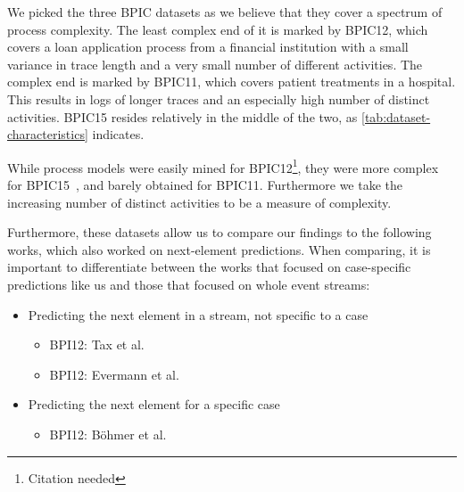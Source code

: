 We picked the three BPIC datasets as we believe that they cover a spectrum of process complexity. The least complex end of it is marked by BPIC12, which covers a loan application process from a financial institution with a small variance in trace length and a very small number of different activities. The complex end is marked by BPIC11, which covers patient treatments in a hospital. This results in logs of longer traces and an especially high number of distinct activities. BPIC15 resides relatively in the middle of the two, as \autoref{tab:dataset-characteristics} indicates.

While process models were easily mined for BPIC12\footnote{Citation needed}, they were more complex for BPIC15~\cite{van2015benchmarking}, and barely obtained for BPIC11. Furthermore we take the increasing number of distinct activities to be a measure of complexity.

Furthermore, these datasets allow us to compare our findings to the following works, which also worked on next-element predictions. When comparing, it is important to differentiate between the works that focused on case-specific predictions like us and those that focused on whole event streams:

\begin{itemize}
    \item Predicting the next element in a stream, not specific to a case
    \begin{itemize}
        \item BPI12: Tax et al.~\cite{tax2018interdisciplinary, tax2017}
        \item BPI12: Evermann et al.~\cite{evermann2016}
    \end{itemize}
    \item Predicting the next element for a specific case
    \begin{itemize}
        \item BPI12: Böhmer et al.~\cite{boehmer2018probability}
    \end{itemize}
\end{itemize}

